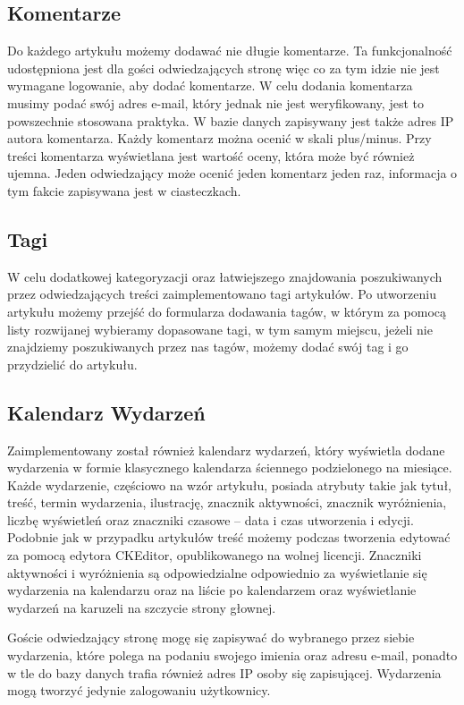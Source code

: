 \documentclass[openright]{xmgr}
\begin{document}
\subsection{Komentarze}
Do każdego artykułu możemy dodawać nie długie komentarze. Ta funkcjonalność udostępniona jest dla gości odwiedzających stronę więc co za tym idzie nie jest wymagane logowanie, aby dodać komentarze. W celu dodania komentarza musimy podać swój adres e-mail, który jednak nie jest weryfikowany, jest to powszechnie stosowana praktyka. W bazie danych zapisywany jest także adres IP autora komentarza. Każdy komentarz można ocenić w skali plus/minus. Przy treści komentarza wyświetlana jest wartość oceny, która może być również ujemna. Jeden odwiedzający może ocenić jeden komentarz jeden raz, informacja o tym fakcie zapisywana jest w ciasteczkach.

\subsection{Tagi}
W celu dodatkowej kategoryzacji oraz łatwiejszego znajdowania poszukiwanych przez odwiedzających treści zaimplementowano tagi artykułów. Po utworzeniu artykułu możemy przejść do formularza dodawania tagów, w którym za pomocą listy rozwijanej wybieramy dopasowane tagi, w tym samym miejscu, jeżeli nie znajdziemy poszukiwanych przez nas tagów, możemy dodać swój tag i go przydzielić do artykułu.

\subsection{Kalendarz Wydarzeń}
Zaimplementowany został również kalendarz wydarzeń, który wyświetla dodane wydarzenia w formie klasycznego kalendarza ściennego podzielonego na miesiące. Każde wydarzenie, częściowo na wzór artykułu, posiada atrybuty takie jak tytuł, treść, termin wydarzenia, ilustrację, znacznik aktywności, znacznik wyróżnienia, liczbę wyświetleń oraz znaczniki czasowe – data i czas utworzenia i edycji. Podobnie jak w przypadku artykułów treść możemy podczas tworzenia  edytować za pomocą edytora CKEditor, opublikowanego na wolnej licencji. Znaczniki aktywności i wyróżnienia są odpowiedzialne odpowiednio za wyświetlanie się wydarzenia na kalendarzu oraz na liście po kalendarzem oraz wyświetlanie wydarzeń na karuzeli na szczycie strony głownej. 

Goście odwiedzający stronę mogę się zapisywać do wybranego przez siebie wydarzenia, które polega na podaniu swojego imienia oraz adresu e-mail, ponadto w tle do bazy danych trafia również adres IP osoby się zapisującej. Wydarzenia mogą tworzyć jedynie zalogowaniu użytkownicy.
\end{document}
